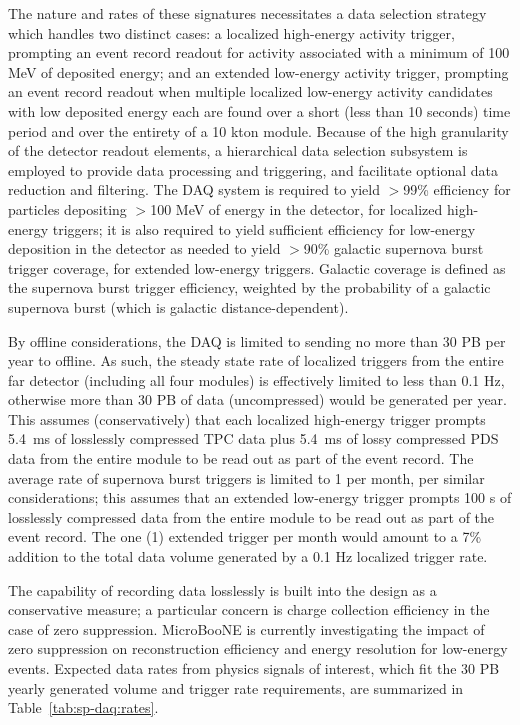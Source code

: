 The nature and rates of these signatures necessitates a data selection strategy which handles two
distinct cases: a localized high-energy activity trigger, prompting an event record readout for
activity associated with a minimum of 100 MeV of deposited energy; and an extended
low-energy activity trigger, prompting an event record readout when
multiple localized low-energy activity candidates with low deposited energy each are found over a short (less than 10
seconds) time period and over the entirety of a 10 kton 
module. Because of the high granularity of the detector readout elements, a
hierarchical data selection subsystem is employed to provide data processing and
triggering, and facilitate optional data reduction and filtering. The
DAQ  
system is required to yield $>$99\% efficiency for particles
depositing $>$100 MeV of energy in the detector, for localized
high-energy triggers; it is also required to yield sufficient efficiency for low-energy
deposition in the detector as needed to yield $>$90\% galactic
supernova burst trigger coverage, for extended low-energy triggers. Galactic coverage is defined as
the supernova burst trigger efficiency, weighted by the probability of
a galactic supernova burst (which is galactic distance-dependent).

By offline considerations, the DAQ is limited to sending no more than
30 PB per year to offline. As such, the steady state rate of localized triggers
from the entire far detector (including all four modules) is
effectively limited to less than 0.1 Hz, otherwise
more than 30 PB of data (uncompressed) would be generated per
year. This assumes (conservatively) that each localized high-energy
trigger prompts \SI{5.4}{\milli\second} of losslessly compressed TPC
data plus \SI{5.4}{\milli\second} of lossy compressed PDS data from
the entire module to be read out as part of the event record. The average rate
of supernova burst triggers is limited to 1 per month, per similar
considerations; this assumes that an extended low-energy trigger prompts 100 s of losslessly
compressed data from the entire module to be read out as part of the
event record. The one (1) extended trigger per month would amount to a
7\% addition to the total data volume generated by a 0.1 Hz localized
trigger rate.

The capability of recording data losslessly is built
into the design as a conservative measure; a particular concern is
charge collection efficiency in the case of zero
suppression. MicroBooNE is currently investigating the impact of zero
suppression on reconstruction efficiency and energy resolution for
low-energy events. Expected
data rates from physics signals of interest, which fit the 30 PB
yearly generated volume and
trigger rate requirements, are summarized in Table~\ref{tab:sp-daq:rates}.

